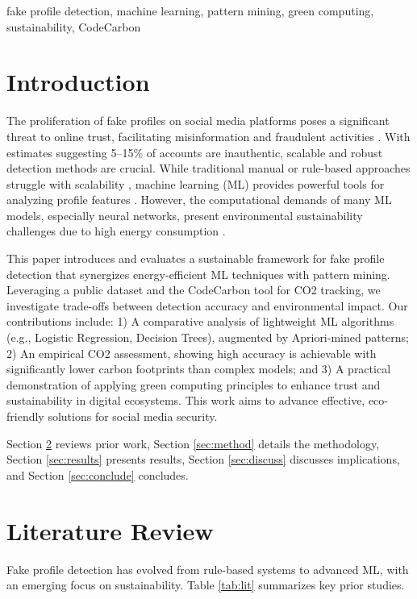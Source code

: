 \documentclass[conference]{IEEEtran}
\begin{document}
\begin{IEEEkeywords}
fake profile detection, machine learning, pattern mining, green computing, sustainability, CodeCarbon
\end{IEEEkeywords}

\section{Introduction}
The proliferation of fake profiles on social media platforms poses a significant threat to online trust, facilitating misinformation and fraudulent activities \cite{b1,b9}. With estimates suggesting 5--15\% of accounts are inauthentic, scalable and robust detection methods are crucial. While traditional manual or rule-based approaches struggle with scalability \cite{b2}, machine learning (ML) provides powerful tools for analyzing profile features \cite{b3}. However, the computational demands of many ML models, especially neural networks, present environmental sustainability challenges due to high energy consumption \cite{b4}.

This paper introduces and evaluates a sustainable framework for fake profile detection that synergizes energy-efficient ML techniques with pattern mining. Leveraging a public dataset \cite{b5} and the CodeCarbon tool \cite{b13} for CO2 tracking, we investigate trade-offs between detection accuracy and environmental impact. Our contributions include: 1) A comparative analysis of lightweight ML algorithms (e.g., Logistic Regression, Decision Trees), augmented by Apriori-mined patterns; 2) An empirical CO2 assessment, showing high accuracy is achievable with significantly lower carbon footprints than complex models; and 3) A practical demonstration of applying green computing principles to enhance trust and sustainability in digital ecosystems. This work aims to advance effective, eco-friendly solutions for social media security.

Section \ref{sec:lit} reviews prior work, Section \ref{sec:method} details the methodology, Section \ref{sec:results} presents results, Section \ref{sec:discuss} discusses implications, and Section \ref{sec:conclude} concludes.

\section{Literature Review}
\label{sec:lit}
Fake profile detection has evolved from rule-based systems to advanced ML, with an emerging focus on sustainability. Table \ref{tab:lit} summarizes key prior studies.
\end{document}
